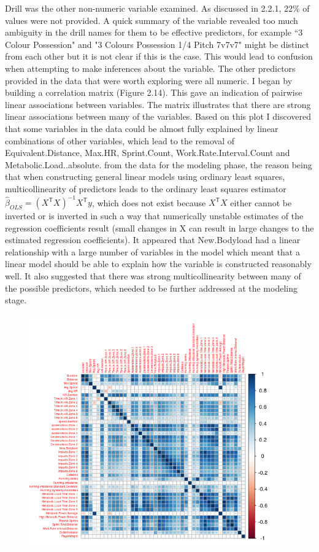 \hfill\break
\newline
Drill was the other non-numeric variable examined. As discussed in 2.2.1, 22\% of values were not provided. A quick summary of the variable revealed too much ambiguity in the drill names for them to be effective predictors, for example ``3 Colour Possession" and "3 Colours Possession 1/4 Pitch 7v7v7" might be distinct from each other but it is not clear if this is the case. This would lead to confusion when attempting to make inferences about the variable.\hfill\break
\newline
The other predictors provided in the data that were worth exploring were all numeric. I began by building a correlation matrix (Figure 2.14). This gave an indication of pairwise linear associations between variables. The matrix illustrates that there are strong linear associations between many of the variables. Based on this plot I discovered that some variables in the data could be almost fully explained by linear combinations of other variables, which lead to the removal of Equivalent.Distance, Max.HR, Sprint.Count, Work.Rate.Interval.Count and Metabolic.Load..absolute. from the data for the modeling phase, the reason being that when constructing general linear models using ordinary least squares, multicollinearity of predictors leads to the ordinary least squares estimator ${\displaystyle {\hat {\beta }}_{OLS}=(X^{\mathsf {T}}X)^{-1}X^{\mathsf {T}}y}$, which does not exist because ${\displaystyle X^{\mathsf {T}}X}$ either cannot be inverted or is inverted in such a way that numerically unstable estimates of the regression coefficients result (small changes in X can result in large changes to the estimated regression coefficients). It appeared that New.Bodyload had a linear relationship with a large number of variables in the model which meant that a linear model should be able to explain how the variable is constructed reasonably well. It also suggested that there was strong multicollinearity between many of the possible predictors, which needed to be further addressed at the modeling stage.
\begin{figure}[h]
	\centering
	\includegraphics[width=0.8\linewidth, height=10cm]{Images/CorrelationPlot.png}
\end{figure}
\hfill\break

